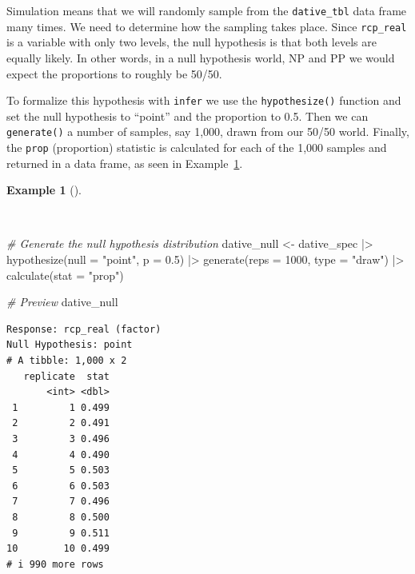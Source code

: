 \documentclass[
  letterpaper,
]{book}
\newenvironment{Shaded}{\begin{snugshade}}{\end{snugshade}}
\newcommand{\AttributeTok}[1]{\textcolor[rgb]{0.00,0.00,0.00}{#1}}
\newcommand{\CommentTok}[1]{\textcolor[rgb]{0.00,0.00,0.00}{\textit{#1}}}
\newcommand{\DecValTok}[1]{\textcolor[rgb]{0.00,0.00,0.00}{#1}}
\newcommand{\FloatTok}[1]{\textcolor[rgb]{0.00,0.00,0.00}{#1}}
\newcommand{\FunctionTok}[1]{\textcolor[rgb]{0.00,0.00,0.00}{#1}}
\newcommand{\NormalTok}[1]{\textcolor[rgb]{0.00,0.00,0.00}{#1}}
\newcommand{\OtherTok}[1]{\textcolor[rgb]{0.00,0.00,0.00}{#1}}
\newcommand{\SpecialCharTok}[1]{\textcolor[rgb]{0.00,0.00,0.00}{#1}}
\newcommand{\StringTok}[1]{\textcolor[rgb]{0.00,0.00,0.00}{#1}}
\theoremstyle{definition}
\newtheorem{example}{Example}[chapter]
\theoremstyle{remark}
\begin{document}
Simulation means that we will randomly sample from the
\texttt{dative\_tbl} data frame many times. We need to determine how the
sampling takes place. Since \texttt{rcp\_real} is a variable with only
two levels, the null hypothesis is that both levels are equally likely.
In other words, in a null hypothesis world, NP and PP we would expect
the proportions to roughly be 50/50.

To formalize this hypothesis with \texttt{infer} we use the
\texttt{hypothesize()} function and set the null hypothesis to ``point''
and the proportion to 0.5. Then we can \texttt{generate()} a number of
samples, say 1,000, drawn from our 50/50 world. Finally, the
\texttt{prop} (proportion) statistic is calculated for each of the 1,000
samples and returned in a data frame, as seen in
Example~\ref{exm-infer-cat-null-hypothesis}.

\begin{example}[]\protect\hypertarget{exm-infer-cat-null-hypothesis}{}\label{exm-infer-cat-null-hypothesis}

~

\begin{Shaded}
\begin{Highlighting}[]
\CommentTok{\# Generate the null hypothesis distribution}
\NormalTok{dative\_null }\OtherTok{\textless{}{-}}
\NormalTok{  dative\_spec }\SpecialCharTok{|\textgreater{}}
  \FunctionTok{hypothesize}\NormalTok{(}\AttributeTok{null =} \StringTok{"point"}\NormalTok{, }\AttributeTok{p =} \FloatTok{0.5}\NormalTok{) }\SpecialCharTok{|\textgreater{}}
  \FunctionTok{generate}\NormalTok{(}\AttributeTok{reps =} \DecValTok{1000}\NormalTok{, }\AttributeTok{type =} \StringTok{"draw"}\NormalTok{) }\SpecialCharTok{|\textgreater{}}
  \FunctionTok{calculate}\NormalTok{(}\AttributeTok{stat =} \StringTok{"prop"}\NormalTok{)}

\CommentTok{\# Preview}
\NormalTok{dative\_null}
\end{Highlighting}
\end{Shaded}

\begin{verbatim}
Response: rcp_real (factor)
Null Hypothesis: point
# A tibble: 1,000 x 2
   replicate  stat
       <int> <dbl>
 1         1 0.499
 2         2 0.491
 3         3 0.496
 4         4 0.490
 5         5 0.503
 6         6 0.503
 7         7 0.496
 8         8 0.500
 9         9 0.511
10        10 0.499
# i 990 more rows
\end{verbatim}

\end{example}
\end{document}
